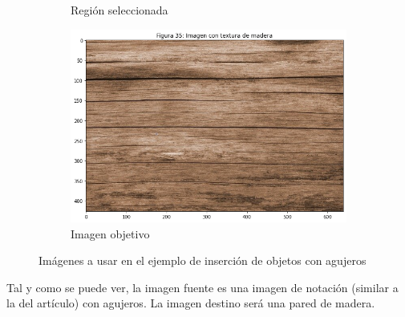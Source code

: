 \documentclass[11pt,twoside,titlepage,a4paper]{article}
\numberwithin{equation}{section} %
\theoremstyle{usual}
\begin{document}
\begin{figure}[h]
\begin{subfigure}[b]{.4\textwidth}
        \caption{Región seleccionada}
    \end{subfigure}
    \begin{subfigure}[b]{.5\textwidth}
        \centering
        \includegraphics[width=\textwidth]{imagenes/PoissonImageEditing_cell_48_output_1.png}
        \caption{Imagen objetivo}
    \end{subfigure}
    \caption{Imágenes a usar en el ejemplo de inserción de objetos con agujeros}
    \label{fig:imagenesUsadasInsercionAgujeros}
\end{figure}

Tal y como se puede ver, la imagen fuente es una imagen de notación (similar a la del artículo) con agujeros. La imagen destino será una pared de madera.
\end{document}
